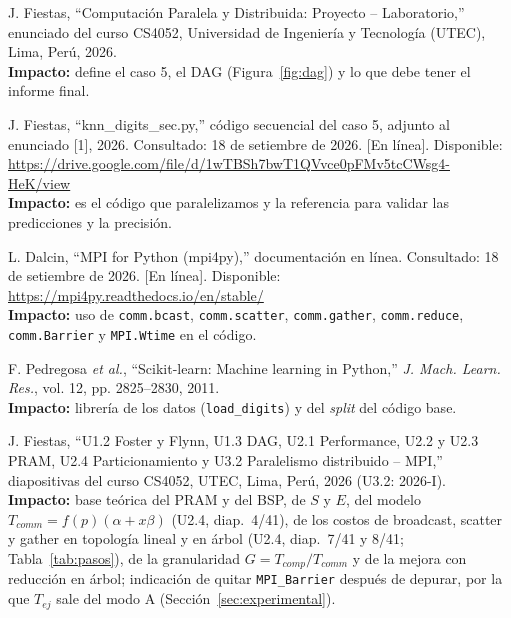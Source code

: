 \documentclass[11pt,a4paper]{article}
\begin{document}
\begin{enumerate}[label={[\arabic*]}, leftmargin=*, itemsep=2pt, parsep=0pt, topsep=2pt]
  \item J. Fiestas, ``Computación Paralela y Distribuida: Proyecto -- Laboratorio,'' enunciado del curso CS4052, Universidad de Ingeniería y Tecnología (UTEC), Lima, Perú, 2026.\\
  \textbf{Impacto:} define el caso 5, el DAG (Figura~\ref{fig:dag}) y lo que debe tener el informe final.

  \item J. Fiestas, ``knn\_digits\_sec.py,'' código secuencial del caso 5, adjunto al enunciado [1], 2026. Consultado: 18 de setiembre de 2026. [En línea]. Disponible: \url{https://drive.google.com/file/d/1wTBSh7bwT1QVvce0pFMv5tcCWsg4-HeK/view}\\
  \textbf{Impacto:} es el código que paralelizamos y la referencia para validar las predicciones y la precisión.

  \item L. Dalcin, ``MPI for Python (mpi4py),'' documentación en línea. Consultado: 18 de setiembre de 2026. [En línea]. Disponible: \url{https://mpi4py.readthedocs.io/en/stable/}\\
  \textbf{Impacto:} uso de \texttt{comm.bcast}, \texttt{comm.scatter}, \texttt{comm.gather}, \texttt{comm.reduce}, \texttt{comm.Barrier} y \texttt{MPI.Wtime} en el código.

  \item F. Pedregosa \textit{et al.}, ``Scikit-learn: Machine learning in Python,'' \textit{J. Mach. Learn. Res.}, vol. 12, pp. 2825--2830, 2011.\\
  \textbf{Impacto:} librería de los datos (\texttt{load\_digits}) y del \textit{split} del código base.

  \item J. Fiestas, ``U1.2 Foster y Flynn, U1.3 DAG, U2.1 Performance, U2.2 y U2.3 PRAM, U2.4 Particionamiento y U3.2 Paralelismo distribuido -- MPI,'' diapositivas del curso CS4052, UTEC, Lima, Perú, 2026 (U3.2: \mbox{2026-I}).\\
  \textbf{Impacto:} base teórica del PRAM y del BSP, de $S$ y $E$, del modelo $T_{comm} = f(p)(\alpha + x\beta)$ (U2.4, diap.~4/41), de los costos de broadcast, scatter y gather en topología lineal y en árbol (U2.4, diap.~7/41 y 8/41; Tabla~\ref{tab:pasos}), de la granularidad $G = T_{comp}/T_{comm}$ y de la mejora con reducción en árbol; indicación de quitar \texttt{MPI\_Barrier} después de depurar, por la que $T_{ej}$ sale del modo A (Sección~\ref{sec:experimental}).


\end{enumerate}
\end{document}
